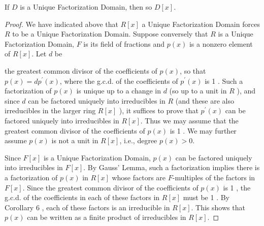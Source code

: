 \begin{theorem}
    If $D$ is a Unique Factorization Domain, then so $D[x]$.
    \begin{proof}
        We have indicated above that $R[x]$ a Unique Factorization Domain forces $R$ to be a Unique Factorization Domain. Suppose conversely that $R$ is a Unique Factorization Domain, $F$ is its field of fractions and $p(x)$ is a nonzero element of $R[x]$. Let $d$ be

        the greatest common divisor of the coefficients of $p(x)$, so that $p(x)=d p^{\prime}(x)$, where the g.c.d. of the coefficients of $p^{\prime}(x)$ is 1 . Such a factorization of $p(x)$ is unique up to a change in $d$ (so up to a unit in $R$ ), and since $d$ can be factored uniquely into irreducibles in $R$ (and these are also irreducibles in the larger ring $R[x]$ ), it suffices to prove that $p^{\prime}(x)$ can be factored uniquely into irreducibles in $R[x]$. Thus we may assume that the greatest common divisor of the coefficients of $p(x)$ is 1 . We may further assume $p(x)$ is not a unit in $R[x]$, i.e., degree $p(x)>0$.

        Since $F[x]$ is a Unique Factorization Domain, $p(x)$ can be factored uniquely into irreducibles in $F[x]$. By Gauss' Lemma, such a factorization implies there is a factorization of $p(x)$ in $R[x]$ whose factors are $F$-multiples of the factors in $F[x]$. Since the greatest common divisor of the coefficients of $p(x)$ is 1 , the g.c.d. of the coefficients in each of these factors in $R[x]$ must be 1 . By Corollary 6 , each of these factors is an irreducible in $R[x]$. This shows that $p(x)$ can be written as a finite product of irreducibles in $R[x]$.


\end{proof}
\end{theorem}
